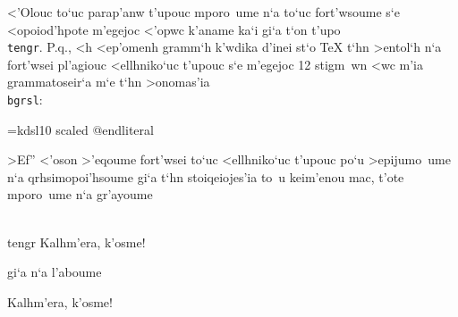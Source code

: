 
\noindent
<'Olouc to`uc parap'anw t'upouc mporo~ume n`a to`uc fort'wsoume s`e
<opoiod'hpote m'egejoc <'opwc k'aname ka`i gi`a t`on t'upo {\tt
\\tengr}.  P.q., <h <ep'omenh gramm`h k'wdika d'inei st`o {\rm \TeX}
t`hn >entol`h n`a fort'wsei pl'agiouc <ellhniko`uc t'upouc s`e m'egejoc
12 stigm~wn <wc m'ia grammatoseir`a m`e t`hn >onomas'ia {\tt \\bgrsl}:

\beginliteral
\font\bgrsl=kdsl10 scaled 
@endliteral

>Ef'' <'oson >'eqoume fort'wsei to`uc <ellhniko`uc t'upouc po`u
>epijumo~ume n`a qrhsimopoi'hsoume gi`a t`hn stoiqeiojes'ia to~u
keim'enou mac, t'ote mpo\-ro~u\-me n`a gr'ayoume

\beginuser
\\tengr Kalhm'era, k'osme!
\enduser

\noindent
gi`a n`a l'aboume

Kalhm'era, k'osme!

